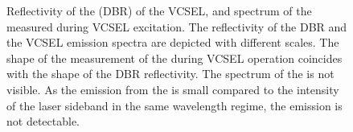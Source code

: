 	\begin{figure}[tp]
		\centering
		\caption{Reflectivity of the \dbr (DBR) of the VCSEL, and spectrum of the \siv measured during VCSEL excitation. The reflectivity of the DBR and the VCSEL emission spectra are depicted with different scales. The shape of the measurement of the \siv during VCSEL operation coincides with the shape of the DBR reflectivity. The spectrum of the \siv is not visible. As the emission from the \siv is small compared to the intensity of the laser sideband in the same wavelength regime, the \sivs emission is not detectable.}
		\label{fig::dbr_vcsel}
	\end{figure}

